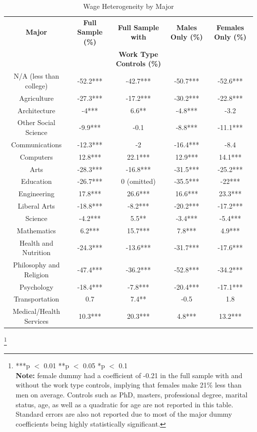 \documentclass[12pt]{article}
\newcommand\blfootnote[1]{%
  \begingroup
  \renewcommand\thefootnote{}\footnote{#1}%
  \addtocounter{footnote}{-1}%
  \endgroup
}
\begin{document}
\begin{landscape}
\begin{center}
\begin{table}[htbp]
\centering
\caption{Wage Heterogeneity by Major}
\begin{tabular}{| c | c c  c  c |}
\hline
\textbf{Major} & \textbf{Full Sample (\%)} & \textbf{Full Sample with} & \textbf{Males Only (\%)} & \textbf{Females Only (\%)} \\
 & & \textbf{Work Type Controls (\%)} & & \\
\hline
N/A (less than college) & -52.2*** & -42.7*** & -50.7*** & -52.6***\\
Agriculture & -27.3*** & -17.2*** & -30.2*** & -22.8***\\
Architecture &  -4*** & 6.6** & -4.8*** & -3.2\\
Other Social Science & -9.9*** & -0.1 & -8.8*** & -11.1***\\
Communications & -12.3*** & -2 & -16.4*** & -8.4\\
Computers & 12.8*** & 22.1*** & 12.9*** & 14.1***\\
Arts & -28.3*** & -16.8*** & -31.5*** & -25.2***\\
Education & -26.7*** & 0 (omitted) & -35.5*** & -22***\\
Engineering & 17.8*** & 26.6*** & 16.6*** & 23.3***\\
Liberal Arts & -18.8*** & -8.2*** & -20.2*** & -17.2***\\
Science & -4.2*** & 5.5** & -3.4*** & -5.4***\\
Mathematics & 6.2*** & 15.7*** & 7.8*** & 4.9***\\
Health and Nutrition & -24.3*** & -13.6*** & -31.7*** & -17.6***\\
Philosophy and Religion & -47.4*** & -36.2*** & -52.8*** & -34.2***\\
Psychology & -18.4*** & -7.8*** & -20.4*** & -17.1***\\
Transportation & 0.7 & 7.4** & -0.5 & 1.8\\
Medical/Health Services & 10.3*** & 20.3*** & 4.8*** & 13.2***\\
\hline
\end{tabular}
\end{table}
\end{center}
\blfootnote{***p $<$ 0.01 **p $<$ 0.05 *p $<$ 0.1
\\ \textbf{Note:} female dummy had a coefficient of -0.21 in the full sample with and without the work type controls, implying that females make 21\% less than men on average. Controls such as PhD, masters, professional degree, marital status, age, as well as a quadratic for age are not reported in this table. Standard errors are also not reported due to most of the major dummy coefficients being highly statistically significant. }
\end{landscape}
\end{document}
